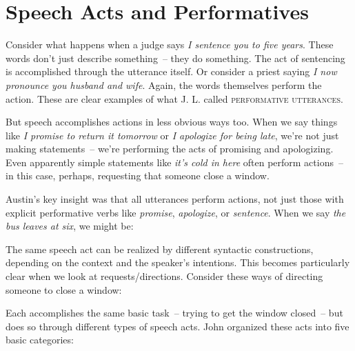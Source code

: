 \section{Speech Acts and Performatives}

Consider what happens when a judge says \textit{I sentence you to five years}. These words don't just describe something~-- they do something. The act of sentencing is accomplished through the utterance itself. Or consider a priest saying \textit{I now pronounce you husband and wife}. Again, the words themselves perform the action. These are clear examples of what J. L. \citet{austin1962} called \textsc{performative utterances}.

But speech accomplishes actions in less obvious ways too. When we say things like \textit{I promise to return it tomorrow} or \textit{I apologize for being late}, we're not just making statements~-- we're performing the acts of promising and apologizing. Even apparently simple statements like \textit{it's cold in here} often perform actions~-- in this case, perhaps, requesting that someone close a window.

Austin's key insight was that all utterances perform actions, not just those with explicit performative verbs like \textit{promise}, \textit{apologize}, or \textit{sentence}. When we say \textit{the bus leaves at six}, we might be:

\ea
    \z
\z

The same speech act can be realized by different syntactic constructions, depending on the context and the speaker's intentions. This becomes particularly clear when we look at requests/directions. Consider these ways of directing someone to close a window:

\ea
   \z
\z

Each accomplishes the same basic task~-- trying to get the window closed~-- but does so through different types of speech acts. John \citet{searle1979} organized these acts into five basic categories:

